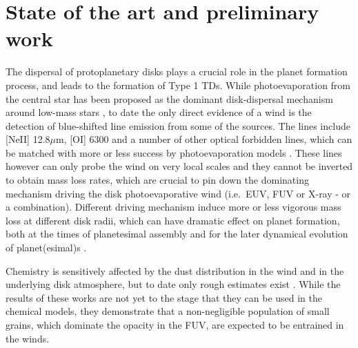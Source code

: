 \documentclass[10pt,fleqn,twoside]{article}
\begin{document}
\section{State of the art and preliminary work}
\renewcommand{\leftmark}{\sc State of the Art and preliminary work}

The dispersal of protoplanetary disks plays a crucial role in the
planet formation process, and leads to the formation of Type
1 TDs. While photoevaporation from the central star has been proposed
as the dominant disk-dispersal mechanism around low-mass stars
\citep[e.g.,][]{2001MNRAS.328..485C}, to date the only direct evidence of a
wind is the detection of blue-shifted line emission from some of the
sources. The lines include [NeII] 12.8$\mu$m, [OI] 6300 and a number
of other optical forbidden lines, which can be matched with more or
less success by photoevaporation models \citep[e.g.,][]{1995ApJ...452..736H,
2008MNRAS.391L..64A, 2013ApJ...772...60R, 2014A&A...569A...5N, 
2009ApJ...702..724P, 2010MNRAS.401.1636S, 2010MNRAS.406.1553E,
2016MNRAS.460.3472E, 2016ApJ...831..169S}. These lines however
can only probe the wind on very local scales and they cannot be
inverted to obtain mass loss rates, which are crucial to pin down the
dominating mechanism driving the disk photoevaporative wind
(i.e.\ EUV, FUV or X-ray - or a combination). Different driving
mechanism induce more or less vigorous mass loss at different disk
radii, which  can have dramatic effect on planet formation, both at
the times of planetesimal assembly and for the later dynamical
evolution of planet(esimal)s 
\citep[e.g.,][or the discussion in projects B1 and B2]{2012MNRAS.422L..82A, 2015MNRAS.450.3008E}.

Chemistry is
sensitively affected by the dust distribution in the wind and in the
underlying disk atmosphere, but to date only rough estimates exist
\citep[e.g.,][]{2011MNRAS.411.1104O, 2016MNRAS.463.2725H, 
2016MNRAS.461..742H}. While
the results of these works are not yet to the stage that they can 
be used in the chemical models, they demonstrate
that a non-negligible population of small grains, which dominate the
opacity in the FUV, are expected to be entrained in the winds. 
\end{document}
